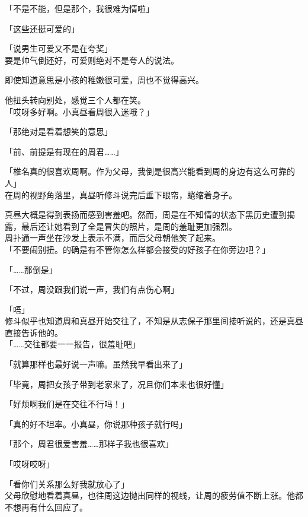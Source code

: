「不是不能，但是那个，我很难为情啦」

「这些还挺可爱的」

「说男生可爱又不是在夸奖」\\

要是帅气倒还好，可爱则绝对不是夸人的说法。

即使知道意思是小孩的稚嫩很可爱，周也不觉得高兴。

他扭头转向别处，感觉三个人都在笑。\\

「哎呀多好啊。小真昼看周很入迷哦？」

「那绝对是看着想笑的意思」

「前、前提是有现在的周君……」

「椎名真的很喜欢周啊。作为父母，我倒是很高兴能看到周的身边有这么可靠的人」\\

在周的视野角落里，真昼听修斗说完后垂下眼帘，蜷缩着身子。

真昼大概是得到表扬而感到害羞吧。然而，周是在不知情的状态下黑历史遭到揭露，最后还让她看到了全是冒失的照片，是周的羞耻更加强烈。\\

周扑通一声坐在沙发上表示不满，而后父母朝他笑了起来。\\

「不要闹别扭。的确是有不管你怎么样都会接受的好孩子在你旁边吧？」

「……那倒是」

「不过，周没跟我们说一声，我们有点伤心啊」

「唔」\\

修斗似乎也知道周和真昼开始交往了，不知是从志保子那里间接听说的，还是真昼直接告诉他的。\\

「……交往都要一一报告，很羞耻吧」

「就算那样也最好说一声嘛。虽然我早看出来了」

「毕竟，周把女孩子带到老家来了，况且你们本来也很好懂」

「好烦啊我们是在交往不行吗！」

「真的好不坦率。小真昼，你说那种孩子就行吗」

「那个，周君很爱害羞……那样子我也很喜欢」

「哎呀哎呀」

「看你们关系那么好我就放心了」\\

父母欣慰地看着真昼，也往周这边抛出同样的视线，让周的疲劳值不断上涨。他都不想再有什么回应了。\\

